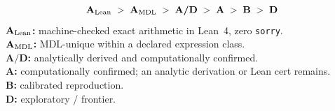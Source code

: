 \documentclass[11pt]{article}
\theoremstyle{remark}
\newcommand{\CatA}{\textbf{A}}
\newcommand{\CatAL}{\ensuremath{\textbf{A}_{\rm Lean}}}
\newcommand{\CatAMDL}{\ensuremath{\textbf{A}_{\rm MDL}}}
\newcommand{\CatAD}{\textbf{A/D}}
\newcommand{\CatB}{\textbf{B}}
\newcommand{\CatD}{\textbf{D}}
\begin{document}
\medskip

\begin{tcolorbox}[colback=gray!4,colframe=gray!50!black,
  title={\textbf{Claim-strength taxonomy}},
  fonttitle=\bfseries,left=6pt,right=6pt,top=5pt,bottom=5pt]
\small
\[
\CatAL \;>\; \CatAMDL \;>\; \CatAD \;>\; \CatA \;>\; \CatB \;>\; \CatD
\]
\textbf{$\CatAL$:} machine-checked exact arithmetic in Lean~4, zero \texttt{sorry}.\\
\textbf{$\CatAMDL$:} MDL-unique within a declared expression class.\\
\textbf{$\CatAD$:} analytically derived and computationally confirmed.\\
\textbf{$\CatA$:} computationally confirmed; an analytic derivation or Lean cert remains.\\
\textbf{$\CatB$:} calibrated reproduction.\\
\textbf{$\CatD$:} exploratory / frontier.
\end{tcolorbox}
\end{document}
